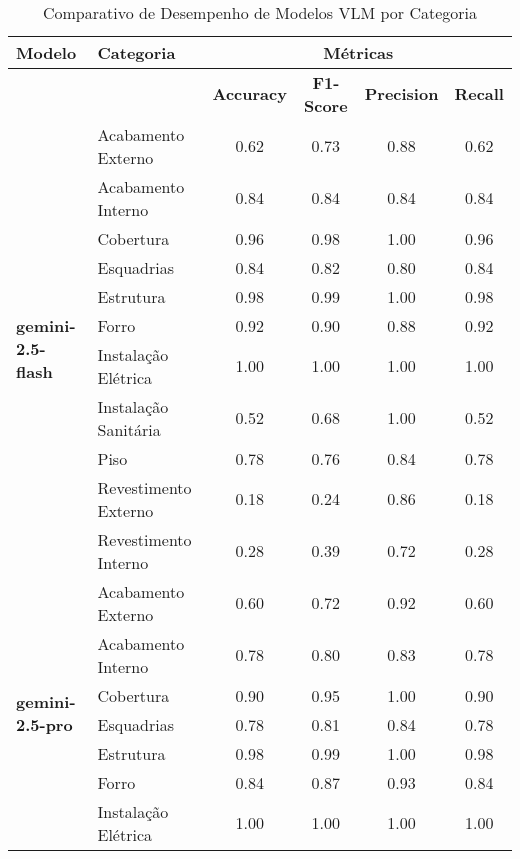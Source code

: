 \begin{table}[htbp]
  \centering
  \caption{Comparativo de Desempenho de Modelos VLM por Categoria}
  \label{tab:vlm_model_category_metrics_final}
  \
  \begin{tabular}{llcccc}
    \textbf{Modelo} & \textbf{Categoria} & \multicolumn{4}{c}{\textbf{Métricas}} \\
    \midrule
     &  & \textbf{Accuracy} & \textbf{F1-Score} & \textbf{Precision} & \textbf{Recall} \\
    \cmidrule(lr){3-6}
    \multirow{11}{*}{\textbf{gemini-2.5-flash}} & \multirow{1}{*}{Acabamento Externo} & 0.62 & 0.73 & 0.88 & 0.62 \\
     & \multirow{1}{*}{Acabamento Interno} & 0.84 & 0.84 & 0.84 & 0.84 \\
     & \multirow{1}{*}{Cobertura} & 0.96 & 0.98 & 1.00 & 0.96 \\
     & \multirow{1}{*}{Esquadrias} & 0.84 & 0.82 & 0.80 & 0.84 \\
     & \multirow{1}{*}{Estrutura} & 0.98 & 0.99 & 1.00 & 0.98 \\
     & \multirow{1}{*}{Forro} & 0.92 & 0.90 & 0.88 & 0.92 \\
     & \multirow{1}{*}{Instalação Elétrica} & 1.00 & 1.00 & 1.00 & 1.00 \\
     & \multirow{1}{*}{Instalação Sanitária} & 0.52 & 0.68 & 1.00 & 0.52 \\
     & \multirow{1}{*}{Piso} & 0.78 & 0.76 & 0.84 & 0.78 \\
     & \multirow{1}{*}{Revestimento Externo} & 0.18 & 0.24 & 0.86 & 0.18 \\
     & \multirow{1}{*}{Revestimento Interno} & 0.28 & 0.39 & 0.72 & 0.28 \\
    \midrule
    \multirow{11}{*}{\textbf{gemini-2.5-pro}} & \multirow{1}{*}{Acabamento Externo} & 0.60 & 0.72 & 0.92 & 0.60 \\
     & \multirow{1}{*}{Acabamento Interno} & 0.78 & 0.80 & 0.83 & 0.78 \\
     & \multirow{1}{*}{Cobertura} & 0.90 & 0.95 & 1.00 & 0.90 \\
     & \multirow{1}{*}{Esquadrias} & 0.78 & 0.81 & 0.84 & 0.78 \\
     & \multirow{1}{*}{Estrutura} & 0.98 & 0.99 & 1.00 & 0.98 \\
     & \multirow{1}{*}{Forro} & 0.84 & 0.87 & 0.93 & 0.84 \\
     & \multirow{1}{*}{Instalação Elétrica} & 1.00 & 1.00 & 1.00 & 1.00 \\

\end{tabular}
\end{table}
